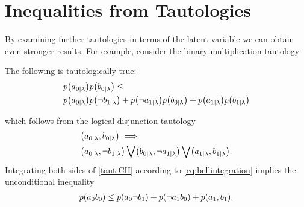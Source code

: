 \section{Inequalities from Tautologies}
By examining further tautologies in terms of the latent variable we can obtain even stronger results. For example, consider the binary-multiplication tautology
\begin{taut}\label{taut:CH}The following is tautologically true:
\begin{align*}
&\p{a_{0|\lambda}} \p{b_{0|\lambda}}\leq
\\& \p{a_{0|\lambda}}\p{\nb_{1|\lambda}} + \p{\na_{1|\lambda}}\p{b_{0|\lambda}} + \p{a_{1|\lambda}}\p{b_{1|\lambda}}
\end{align*}
\end{taut}
\noindent which follows from the logical-disjunction tautology
\begin{align}\begin{split}\label{eq:CHtautraw}
&\parens*{a_{0|\lambda} , b_{0|\lambda}} \implies\\& \parens*{a_{0|\lambda} , \nb_{1|\lambda}} \bigvee \parens*{b_{0|\lambda} , \na_{1|\lambda}} \bigvee \parens*{a_{1|\lambda} , b_{1|\lambda}}.
\end{split}\end{align}
Integrating both sides of \cref{taut:CH} according to \cref{eq:bellintegration} implies the unconditional inequality
\begin{align}\label{eq:CHraw}
{\p{a_0 b_0} \leq \p{a_0 \nb_1} + \p{\na_1 b_0} + \p{a_1,b_1}}.
\end{align}
